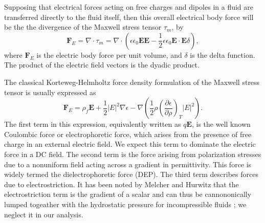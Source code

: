 \documentclass[12pt,a4paper,oneside]{book}
\begin{document}
Supposing that electrical forces acting on free charges and dipoles in a fluid are transferred directly to the fluid itself, then this overall electrical body force will be the the divergence of the Maxwell stress tensor $\tau_m $, by
\[ \mathbf{F}_E = \nabla \cdot \tau_m = \nabla \cdot \left( \epsilon \epsilon_0 \mathbf{E} \mathbf{E} - \frac{1}{2} \epsilon \epsilon_0 \mathbf{E} \cdot \mathbf{E} \delta \right) ,\]
where $\mathbf{F}_E$ is the electric body force per unit volume, and $\delta$ is the delta function. The product of the electric field vectors is the dyadic product.  

The classical Korteweg-Helmholtz force density formulation of the Maxwell stress tensor is usually expressed as \cite{melcher_continuum_????}
\begin{equation}\label{force_density}
\mathbf{F}_E = \rho_f \mathbf{E} + \frac{1}{2} \left| E \right|^2 \nabla \epsilon - \nabla \left( \frac{1}{2} \rho \left( \frac{\partial \epsilon}{\partial \rho} \right)_T \left| E \right|^2 \right) .
\end{equation}
The first term in this expression, equivalently written as $q\mathbf{E}$, is the well known Coulombic force or electrophoretic force, which arises from the presence of free charge in an external electric field. We expect this term to dominate the electric force in a DC field. The second term is the force arising from polarization stresses due to a nonuniform field acting across a gradient in permittivity. This force is widely termed the dielectrophoretic force (DEP). The third term describes forces due to electrostriction. It has been noted by Melcher and Hurwitz that the electrostriction term is the gradient of a scalar and can thus be cannononically lumped togeather with the hydrostatic pressure for incompressible fluids \cite{hurwitz_electrohydrodynamic_1966}; we neglect it in our analysis. 
\end{document}
